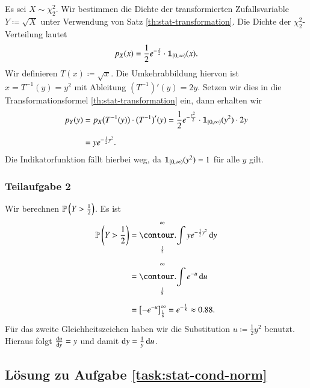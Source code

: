 Es sei $X \sim \chi_2^2$. Wir bestimmen die Dichte der transformierten Zufallsvariable $Y \coloneqq \sqrt{X}$ unter Verwendung von Satz \ref{th:stat-transformation}. Die Dichte der $\chi_2^2$-Verteilung lautet
\begin{equation*}
	p_X(x) = \frac{1}{2} e^{-\frac{x}{2}} \cdot \bm{1}_{[0, \infty)}(x).
\end{equation*}
Wir definieren $T(x) \coloneqq \sqrt{x}$. Die Umkehrabbildung hiervon ist $x = T^{-1}(y) = y^2$ mit Ableitung $(T^{-1})'(y) = 2y$. Setzen wir dies in die Transformationsformel \ref{th:stat-transformation} ein, dann erhalten wir
\begin{align*}
	p_Y(y)
		&= p_X\bigl( T^{-1}(y) \bigr) \cdot \bigl( T^{-1} \bigr)'(y)
			= \frac{1}{2} e^{-\frac{y^2}{2}} \cdot \bm{1}_{[0, \infty)}(y^2) \cdot 2 y
\\[2mm]
		&= y e^{-\frac{1}{2} y^2}.
\end{align*}
Die Indikatorfunktion fällt hierbei weg, da $\bm{1}_{[0, \infty)}(y^2) = 1$ für alle $y$ gilt.

\subsubsection*{Teilaufgabe 2}

Wir berechnen $\mathbb{P}\left( Y > \frac{1}{2} \right)$. Es ist
\begin{align*}
	\Prob\left( Y > \frac{1}{2} \right)
		&= \int_{\frac{1}{2}}^\infty y e^{-\frac{1}{2} y^2}\,\diff y
\\[2mm]
		&= \int_{\frac{1}{8}}^\infty e^{-u}\,\diff u
\\[2mm]
		&= \bigl[ -e^{-u} \bigr]_{\frac{1}{8}}^\infty
			= e^{-\frac{1}{8}} \approx 0.88.
\end{align*}
Für das zweite Gleichheitszeichen haben wir die Substitution $u \coloneqq \frac{1}{2} y^2$ benutzt. Hieraus folgt $\frac{\text{d} u}{\text{d} y} = y$ und damit $\text{d} y = \frac{1}{y}\,\text{d} u$.


\subsection*{Lösung zu Aufgabe \ref{task:stat-cond-norm}}

